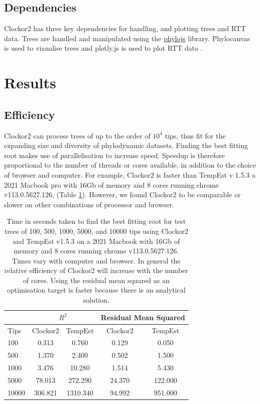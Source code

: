 \documentclass{article}
\begin{document}
\subsection*{Dependencies}
Clockor2 has three key dependencies for handling, and plotting trees and RTT data. Trees are handled and manipulated using the \href{https://github.com/clockor2/phylojs}{phylojs} library. Phylocanvas is used to viaualise trees and plotly.js is used to plot RTT data \citep{abudahab_phylocanvasgl_2021,plotly}.

\section*{Results}
\subsection*{Efficiency}
Clockor2 can process trees of up to the order of $10^4$ tips, thus fit for the expanding size and diversity of phylodynamic datasets. Finding the best fitting root makes use of parallelisation to increase speed. Speedup is therefore proportional to the number of threads or cores available, in addition to the choice of browser and computer. For example, Clockor2 is faster than TempEst v 1.5.3 a 2021 Macbook pro with 16Gb of memory and 8 cores running chrome v113.0.5627.126, (Table \ref{tab:bfr}). However, we found Clockor2 to be comparable or slower on other combinations of processor and browser. 
\begin{table}[H]
    \centering
    \caption{Time in seconds taken to find the best fitting root for test trees of 100, 500, 1000, 5000, and 10000 tips using Clockor2 and TempEst v1.5.3 on a 2021 Macbook with 16Gb of memory and 8 cores running chrome v113.0.5627.126. Times vary with computer and browser. In general the relative efficiency of Clockor2 will increase with the number of cores. Using the residual mean squared as an optimisation target is faster because there is an analytical solution.}
    \begin{tabular}{|l|c|c|c|c|}
    		\cline{2-5}
    		\multicolumn{1}{c}{}		 & \multicolumn{2}{|c|}{$R^{2}$} & \multicolumn{2}{|c|}{Residual Mean Squared}  \\
    		\hline
        Tips    & Clockor2  & TempEst & Clockor2  & TempEst   \\
        \hline
        100  & 0.313 & 0.760 & 0.129 & 0.050 \\
        500  & 1.370 & 2.400 & 0.502 & 1.500 \\
        1000  & 3.476 & 10.280 & 1.514 & 5.430 \\
        5000 & 78.013 & 272.290 & 24.370 & 122.000 \\
        10000  & 306.821 & 1310.340 & 94.992 & 951.000 \\
        \hline
    \end{tabular}
    \label{tab:bfr}
\end{table}
\end{document}
